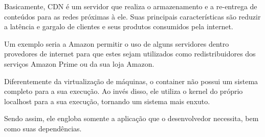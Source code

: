 \documentclass[answers]{exam}
\begin{document}
\begin{questions}
\begin{framed}
Basicamente, CDN é um servidor que realiza o armazenamento e a re-entrega de conteúdos para as redes próximas à ele.
Suas principais características são reduzir a latência e gargalo de clientes e seus produtos consumidos pela internet.

Um exemplo seria a Amazon permitir o uso de alguns servidores dentro provedores de internet para que estes sejam utilizados como redistribuidores dos serviços Amazon Prime ou da sua loja Amazon.
\end{framed}



\begin{framed}
Diferentemente da virtualização de máquinas, o container não possui um sistema completo para a sua execução. 
Ao invés disso, ele utiliza o kernel do próprio localhost para a sua execução, tornando um sistema mais enxuto.

Sendo assim, ele engloba somente a aplicação que o desenvolvedor necessita, bem como suas dependências.
\end{framed}



\begin{framed}
\texttt{ }
\end{framed}



\begin{framed}
\texttt{ }
\end{framed}



\begin{framed}
\texttt{ }
\end{framed}



\end{questions}
\end{document}

